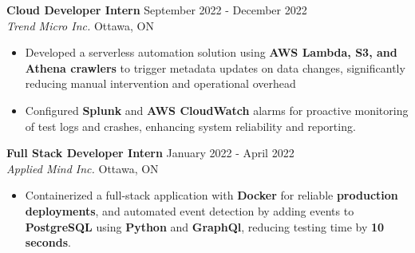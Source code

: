 \documentclass[a4paper]{article}
\begin{document}
\textbf{Cloud Developer Intern} \hfill September 2022 - December 2022\\
\textit{Trend Micro Inc.} \hfill Ottawa, ON\\
\vspace{-2mm}
\begin{itemize} \itemsep -2pt
        \item Developed a serverless automation solution using \textbf{AWS Lambda, S3, and Athena crawlers} to trigger metadata updates on data changes, significantly reducing manual intervention and operational overhead
        \item Configured \textbf{Splunk} and \textbf{AWS CloudWatch} alarms for proactive monitoring of test logs and crashes, enhancing system reliability and reporting.
\end{itemize}
\textbf{Full Stack Developer Intern} \hfill January 2022 - April 2022\\
\textit{Applied Mind Inc.} \hfill Ottawa, ON\\
\vspace{-2mm}
\begin{itemize} \itemsep -2pt
\item Containerized a full-stack application with \textbf{Docker} for reliable \textbf{production deployments}, and automated event detection by adding events to \textbf{PostgreSQL} using \textbf{Python} and \textbf{GraphQl}, reducing testing time by \textbf{10 seconds}.
\end{itemize}
\vspace{5mm}
\end{document}
